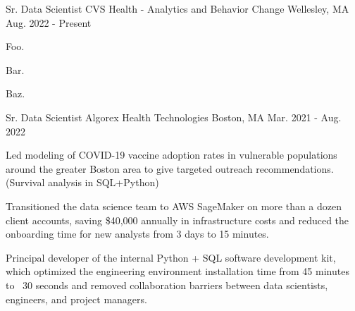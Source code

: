 

\begin{cventries}

  \cventry
    {Sr. Data Scientist} %
    {CVS Health - Analytics and Behavior Change} %
    {Wellesley, MA} %
    {Aug. 2022 - Present} %
    {
      \begin{cvitems} %
      \item {
        Foo.
      }
      \item {
        Bar.
      }
      \item {
        Baz.
      }
      \end{cvitems}
    }

  \cventry
    {Sr. Data Scientist} %
    {Algorex Health Technologies} %
    {Boston, MA} %
    {Mar. 2021 - Aug. 2022} %
    {
      \begin{cvitems} %
      \item {
        Led modeling of COVID-19 vaccine adoption rates in vulnerable
        populations around the greater Boston area to give targeted outreach
        recommendations. (Survival analysis in SQL+Python)
      }
      \item {
        Transitioned the data science team to AWS SageMaker on more than a dozen
        client accounts, saving \$40,000 annually in infrastructure costs and
        reduced the onboarding time for new analysts from 3 days to 15 minutes.
      }
      \item {
        Principal developer of the internal Python + SQL software development
        kit, which optimized the engineering environment installation time from
        45 minutes to ~30 seconds and removed collaboration barriers between
        data scientists, engineers, and project managers.
      }
      \end{cvitems}
    }


\end{cventries}
